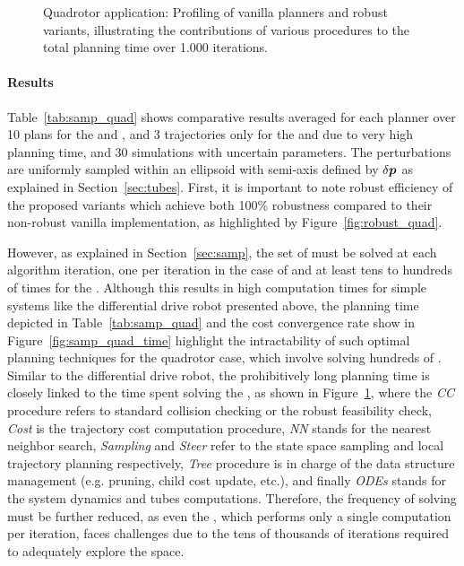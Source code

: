 \begin{figure} [h!]
    \centering
     
    \caption{Quadrotor application: Profiling of vanilla planners and robust variants, illustrating the contributions of various procedures to the total planning time over 1.000 iterations.
    }%
    \label{fig:profiling_quad}%
\end{figure}

\paragraph{Results}

Table~\ref{tab:samp_quad} shows comparative results averaged for each planner over 10 plans for the  and , and 3 trajectories only for the  and  due to very high planning time, and 30 simulations with uncertain parameters. 
The perturbations are uniformly sampled within an ellipsoid with semi-axis defined by $\delta \boldsymbol{p}$ as explained in Section~\ref{sec:tubes}.
First, it is important to note robust efficiency of the proposed  variants which achieve both 100\% robustness compared to their non-robust vanilla implementation, as highlighted by Figure~\ref{fig:robust_quad}.

However, as explained in Section~\ref{sec:samp}, the set of  must be solved at each algorithm iteration, one per iteration in the case of  and at least tens to hundreds of times for the .
Although this results in high computation times for simple systems like the differential drive robot presented above, the planning time depicted in Table~\ref{tab:samp_quad} and the cost convergence rate show in Figure~\ref{fig:samp_quad_time} highlight the intractability of such optimal planning techniques for the quadrotor case, which involve solving hundreds of .
Similar to the differential drive robot, the prohibitively long planning time is closely linked to the time spent solving the , as shown in Figure~\ref{fig:profiling_quad}, where the \emph{CC} procedure refers to standard collision checking or the robust feasibility check, \emph{Cost} is the trajectory cost computation procedure, \emph{NN} stands for the nearest neighbor search, \emph{Sampling} and \emph{Steer} refer to the state space sampling and local trajectory planning respectively, \emph{Tree} procedure is in charge of the data structure management (e.g. pruning, child cost update, etc.), and finally \emph{ODEs} stands for the system dynamics and tubes computations.
Therefore, the frequency of  solving must be further reduced, as even the , which performs only a single computation per iteration, faces challenges due to the tens of thousands of iterations required to adequately explore the space.

